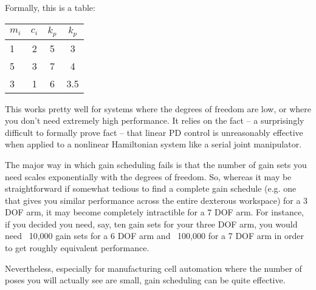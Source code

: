 \documentclass[]{article}
\begin{document}
Formally, this is a table:
\begin{table}[h!]
  \begin{center}
    \label{tab:table1}
    \begin{tabular}{lccc} %
      \textbf{$m_{i}$} & \textbf{$c_{i}$} & \textbf{$k_{p}$} & \textbf{$k_{p}$} \\ 
      \hline
      1 & 2 & 5 & 3\\
      5 & 3 & 7 & 4\\
      3 & 1 & 6 & 3.5\\
    \end{tabular}
  \end{center}
\end{table}

This works pretty well for systems where the degrees of freedom are low, or where you don't need extremely high performance. It relies on the fact -- a surprisingly difficult to formally prove fact -- that linear PD control is unreasonably effective when applied to a nonlinear Hamiltonian system like a serial joint manipulator.

The major way in which gain scheduling fails is that the number of gain sets you need scales exponentially with the degrees of freedom. So, whereas it may be straightforward if somewhat tedious to find a complete gain schedule (e.g. one that gives you similar performance across the entire dexterous workspace) for a 3 DOF arm, it may become completely intractible for a 7 DOF arm. For instance, if you decided you need, say, ten gain sets for your three DOF arm, you would need ~10,000 gain sets for a 6 DOF arm and ~100,000 for a 7 DOF arm in order to get roughly equivalent performance.

Nevertheless, especially for manufacturing cell automation where the number of poses you will actually see are small, gain scheduling can be quite effective.

% 
\end{document}
